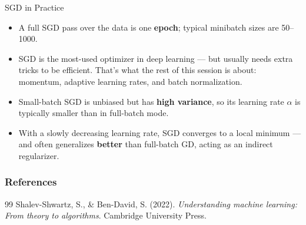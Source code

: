 \begin{vbframe}{SGD in Practice}
  \begin{itemize}
    \item A full SGD pass over the data is one \textbf{epoch}; typical minibatch sizes are 50--1000.
    \item SGD is the most-used optimizer in deep learning --- but usually needs extra tricks to be efficient. That's what the rest of this session is about: momentum, adaptive learning rates, and batch normalization.
    \item Small-batch SGD is unbiased but has \textbf{high variance}, so its learning rate $\alpha$ is typically smaller than in full-batch mode.
    \item With a slowly decreasing learning rate, SGD converges to a local minimum --- and often generalizes \textbf{better} than full-batch GD, acting as an indirect regularizer.
  \end{itemize}
\end{vbframe}
\begin{vbframe}
\frametitle{References}
\footnotesize{
\begin{thebibliography}{99}
 Shalev-Shwartz, S., \& Ben-David, S. (2022). \textit{Understanding machine learning: From theory to algorithms}. Cambridge University Press.
\end{thebibliography}
}
\end{vbframe}


